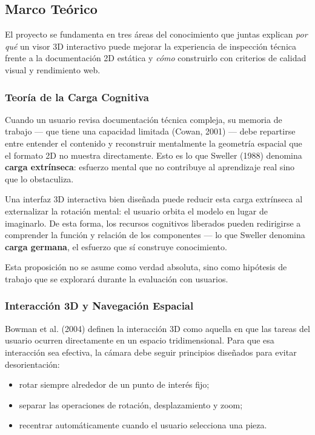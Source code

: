 \subsection{Marco Te\'orico}

El proyecto se fundamenta en tres \'areas del conocimiento que juntas explican \textit{por qu\'e} un visor 3D interactivo puede mejorar la experiencia de inspecci\'on t\'ecnica frente a la documentaci\'on 2D est\'atica y \textit{c\'omo} construirlo con criterios de calidad visual y rendimiento web.

\subsubsection{Teor\'ia de la Carga Cognitiva}

Cuando un usuario revisa documentaci\'on t\'ecnica compleja, su memoria de trabajo — que tiene una capacidad limitada (Cowan, 2001) — debe repartirse entre entender el contenido y reconstruir mentalmente la geometr\'ia espacial que el formato 2D no muestra directamente. Esto es lo que Sweller (1988) denomina \textbf{carga extr\'inseca}: esfuerzo mental que no contribuye al aprendizaje real sino que lo obstaculiza.

Una interfaz 3D interactiva bien dise\~nada puede reducir esta carga extr\'inseca al externalizar la rotaci\'on mental: el usuario orbita el modelo en lugar de imaginarlo. De esta forma, los recursos cognitivos liberados pueden redirigirse a comprender la funci\'on y relaci\'on de los componentes — lo que Sweller denomina \textbf{carga germana}, el esfuerzo que s\'i construye conocimiento.

Esta proposici\'on no se asume como verdad absoluta, sino como hip\'otesis de trabajo que se explorar\'a durante la evaluaci\'on con usuarios.

\subsubsection{Interacci\'on 3D y Navegaci\'on Espacial}

Bowman et al. (2004) definen la interacci\'on 3D como aquella en que las tareas del usuario ocurren directamente en un espacio tridimensional. Para que esa interacci\'on sea efectiva, la c\'amara debe seguir principios dise\~nados para evitar desorientaci\'on:

\begin{itemize}
    \item rotar siempre alrededor de un punto de inter\'es fijo;
    \item separar las operaciones de rotaci\'on, desplazamiento y zoom;
    \item recentrar autom\'aticamente cuando el usuario selecciona una pieza.
\end{itemize}

